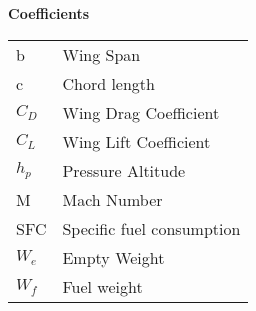 \hspace{-0.5in}\textbf{Coefficients}
{\renewcommand\arraystretch{1.0}
\noindent\begin{longtable*}{@{}l @{\quad=\quad} l@{}}
    b & Wing Span \\
    c & Chord length \\
    $C_D$ & Wing Drag Coefficient \\
    $C_L$ & Wing Lift Coefficient \\ %
    $h_p$ & Pressure Altitude \\
    M & Mach Number \\
    SFC & Specific fuel consumption \\
    $W_e$ & Empty Weight\\
    $W_f$ & Fuel weight \\
\end{longtable*}}
